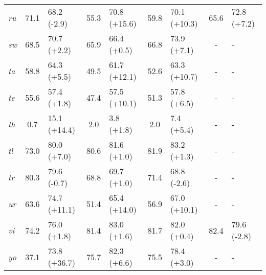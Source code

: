 \documentclass[11pt,dvipsnames]{article}
\begin{document}
\begin{table*}[ht!]
\begin{tabular}{lcccccccccccc}
\textit{ru}&71.1&\multicolumn{2}{l}{\cellcolor[HTML]{FADBD8} 68.2 (-2.9)}&55.3&\multicolumn{2}{l}{\cellcolor[HTML]{52BE80} 70.8 (+15.6)}&59.8&\multicolumn{2}{l}{\cellcolor[HTML]{52BE80} 70.1 (+10.3)}&65.6&\multicolumn{2}{l}{\cellcolor[HTML]{7DCEA0} 72.8 (+7.2)}\\
\textit{sw}&68.5&\multicolumn{2}{l}{\cellcolor[HTML]{A9DFBF} 70.7 (+2.2)}&65.9&\multicolumn{2}{l}{\cellcolor[HTML]{E9F7EF} 66.4 (+0.5)}&66.8&\multicolumn{2}{l}{\cellcolor[HTML]{7DCEA0} 73.9 (+7.1)}&-&\multicolumn{2}{l}{-}\\
\textit{ta}&58.8&\multicolumn{2}{l}{\cellcolor[HTML]{7DCEA0} 64.3 (+5.5)}&49.5&\multicolumn{2}{l}{\cellcolor[HTML]{52BE80} 61.7 (+12.1)}&52.6&\multicolumn{2}{l}{\cellcolor[HTML]{52BE80} 63.3 (+10.7)}&-&\multicolumn{2}{l}{-}\\
\textit{te}&55.6&\multicolumn{2}{l}{\cellcolor[HTML]{A9DFBF} 57.4 (+1.8)}&47.4&\multicolumn{2}{l}{\cellcolor[HTML]{52BE80} 57.5 (+10.1)}&51.3&\multicolumn{2}{l}{\cellcolor[HTML]{7DCEA0} 57.8 (+6.5)}&-&\multicolumn{2}{l}{-}\\
\textit{th}&0.7&\multicolumn{2}{l}{\cellcolor[HTML]{52BE80} 15.1 (+14.4)}&2.0&\multicolumn{2}{l}{\cellcolor[HTML]{A9DFBF} 3.8 (+1.8)}&2.0&\multicolumn{2}{l}{\cellcolor[HTML]{7DCEA0} 7.4 (+5.4)}&-&\multicolumn{2}{l}{-}\\
\textit{tl}&73.0&\multicolumn{2}{l}{\cellcolor[HTML]{7DCEA0} 80.0 (+7.0)}&80.6&\multicolumn{2}{l}{\cellcolor[HTML]{A9DFBF} 81.6 (+1.0)}&81.9&\multicolumn{2}{l}{\cellcolor[HTML]{A9DFBF} 83.2 (+1.3)}&-&\multicolumn{2}{l}{-}\\
\textit{tr}&80.3&\multicolumn{2}{l}{\cellcolor[HTML]{FDEDEC} 79.6 (-0.7)}&68.8&\multicolumn{2}{l}{\cellcolor[HTML]{A9DFBF} 69.7 (+1.0)}&71.4&\multicolumn{2}{l}{\cellcolor[HTML]{FADBD8} 68.8 (-2.6)}&-&\multicolumn{2}{l}{-}\\
\textit{ur}&63.6&\multicolumn{2}{l}{\cellcolor[HTML]{52BE80} 74.7 (+11.1)}&51.4&\multicolumn{2}{l}{\cellcolor[HTML]{52BE80} 65.4 (+14.0)}&56.9&\multicolumn{2}{l}{\cellcolor[HTML]{52BE80} 67.0 (+10.1)}&-&\multicolumn{2}{l}{-}\\
\textit{vi}&74.2&\multicolumn{2}{l}{\cellcolor[HTML]{A9DFBF} 76.0 (+1.8)}&81.4&\multicolumn{2}{l}{\cellcolor[HTML]{A9DFBF} 83.0 (+1.6)}&81.7&\multicolumn{2}{l}{\cellcolor[HTML]{E9F7EF} 82.0 (+0.4)}&82.4&\multicolumn{2}{l}{\cellcolor[HTML]{FADBD8} 79.6 (-2.8)}\\
\textit{yo}&37.1&\multicolumn{2}{l}{\cellcolor[HTML]{52BE80} 73.8 (+36.7)}&75.7&\multicolumn{2}{l}{\cellcolor[HTML]{7DCEA0} 82.3 (+6.6)}&75.5&\multicolumn{2}{l}{\cellcolor[HTML]{A9DFBF} 78.4 (+3.0)}&-&\multicolumn{2}{l}{-}\\

\end{tabular}
\end{table*}
\end{document}
